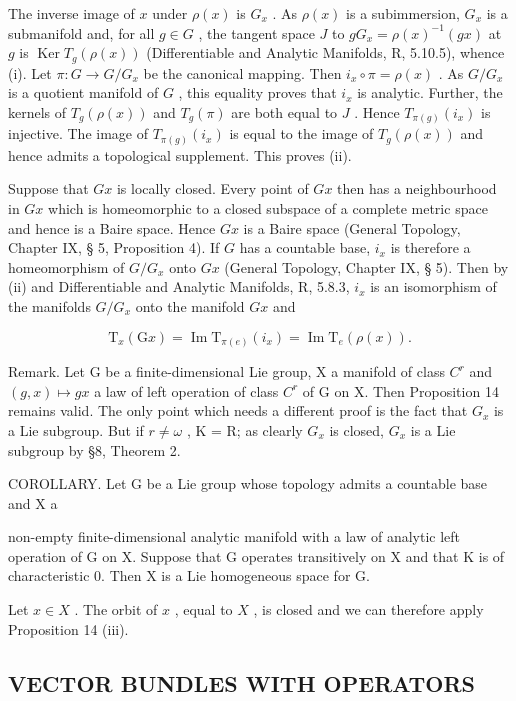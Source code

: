 The inverse image of \(x\) under \(\rho(x)\) is \(G_x\) . As \(\rho(x)\) is a subimmersion, \(G_x\) is a submanifold and, for all \(g \in G\) , the tangent space \(J\) to \(gG_x = \rho(x)^{-1}(gx)\) at \(g\) is \(\operatorname{Ker} T_g(\rho(x))\) (Differentiable and Analytic Manifolds, R, 5.10.5), whence (i). Let \(\pi: G \to G/G_x\) be the canonical mapping. Then \(i_x \circ \pi = \rho(x)\) . As \(G/G_x\) is a quotient manifold of \(G\) , this equality proves that \(i_x\) is analytic. Further, the kernels of \(T_g(\rho(x))\) and \(T_g(\pi)\) are both equal to \(J\) . Hence \(T_{\pi(g)}(i_x)\) is injective. The image of \(T_{\pi(g)}(i_x)\) is equal to the image of \(T_g(\rho(x))\) and hence admits a topological supplement. This proves (ii).

Suppose that \(Gx\) is locally closed. Every point of \(Gx\) then has a neighbourhood in \(Gx\) which is homeomorphic to a closed subspace of a complete metric space and hence is a Baire space. Hence \(Gx\) is a Baire space (General Topology, Chapter IX, § 5, Proposition 4). If \(G\) has a countable base, \(i_x\) is therefore a homeomorphism of \(G / G_x\) onto \(Gx\) (General Topology, Chapter IX, § 5). Then by (ii) and Differentiable and Analytic Manifolds, R, 5.8.3, \(i_x\) is an isomorphism of the manifolds \(G / G_x\) onto the manifold \(Gx\) and

\[
\mathrm{T} _ {x} (\mathrm{G} x) = \operatorname{Im} \mathrm{T} _ {\pi (e)} (i _ {x}) = \operatorname{Im} \mathrm{T} _ {e} (\rho (x)).
\]

Remark. Let G be a finite-dimensional Lie group, X a manifold of class \(C^{r}\) and \((g, x) \mapsto gx\) a law of left operation of class \(C^{r}\) of G on X. Then Proposition 14 remains valid. The only point which needs a different proof is the fact that \(G_{x}\) is a Lie subgroup. But if \(r \neq \omega\) , K = R; as clearly \(G_{x}\) is closed, \(G_{x}\) is a Lie subgroup by §8, Theorem 2.

COROLLARY. Let G be a Lie group whose topology admits a countable base and X a

non-empty finite-dimensional analytic manifold with a law of analytic left operation of G on X. Suppose that G operates transitively on X and that K is of characteristic 0. Then X is a Lie homogeneous space for G.

Let \(x \in X\) . The orbit of \(x\) , equal to \(X\) , is closed and we can therefore apply Proposition 14 (iii).

\subsection{VECTOR BUNDLES WITH OPERATORS}

